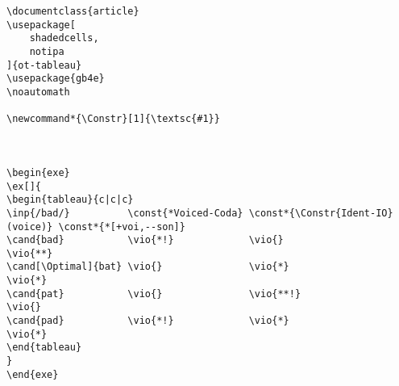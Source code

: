 \begin{listing}[htbp]
	\centering
	\begin{verbatim}
\documentclass{article}
\usepackage[
    shadedcells,
    notipa
]{ot-tableau}
\usepackage{gb4e}
\noautomath

\newcommand*{\Constr}[1]{\textsc{#1}}



\begin{exe}
\ex[]{
\begin{tableau}{c|c|c}
\inp{/bad/}          \const{*Voiced-Coda} \const*{\Constr{Ident-IO}(voice)} \const*{*[+voi,--son]}
\cand{bad}           \vio{*!}             \vio{}                            \vio{**}
\cand[\Optimal]{bat} \vio{}               \vio{*}                           \vio{*}
\cand{pat}           \vio{}               \vio{**!}                         \vio{}
\cand{pad}           \vio{*!}             \vio{*}                           \vio{*}
\end{tableau}
}
\end{exe}


	\end{verbatim}
	\caption{An example of an OT tableau using }
	\label{lst:example-tableau}
\end{listing}